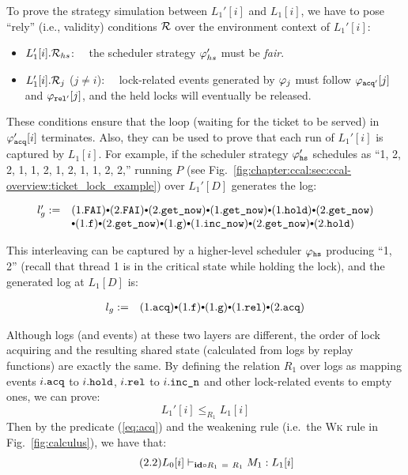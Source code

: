 To prove the strategy simulation between $L_1'[i]$ and $L_1[i]$, we have to  pose ``rely'' (i.e.,
validity) conditions $\mathcal{R}$ over the environment context of $L_1'[i]$:

\begin{itemize}\itemsep1em
\item $L_1'[i].\mathcal{R}_{hs}$:~~  the scheduler strategy $\varphi_{hs}'$ must be \emph{fair}.
\item $L_1'[i].\mathcal{R}_{j}$ ($j\neq i$):~~ lock-related events 
 generated by $\varphi_{j}$ must follow $\varphi_{{\mathrm{\texttt{acq}}}'}[j]$ and $\varphi_{{\mathrm{\texttt{rel}}}'}[j]$, and the held locks will eventually be released.
\end{itemize}

\noindent These conditions ensure that the loop (waiting for the ticket 
to be served) in $\varphi_{{\mathrm{\texttt{acq}}}}'[i]$  terminates. Also, they can be used to prove that each run of $L_1'[i]$ is captured by $L_1[i]$. For example, if the scheduler strategy  $\varphi_{{\mathrm{\texttt{hs}}}}'$ schedules as  ``1, 2, 2, 1, 1, 2, 1, 2, 1, 1, 2, 2,'' running $P$ (see Fig.~\ref{fig:chapter:ccal:sec:ccal-overview:ticket_lock_example}) over $L_1'[D]$ generates the log:%

\begin{small}
\[
\begin{array}{rl}
l'_{g} := &
 (1.\incticket) \cons
(2.\incticket) \cons
(2.\getnow) \cons
(1.\getnow)  \cons 
 (1.\holdlock) \cons 
(2.\getnow) \\
&
\cons (1.\codeinmath{f})
\cons (2.\getnow)
\cons (1.\codeinmath{g})
\cons (1.\incnow) 
\cons (2.\getnow)
\cons (2.\holdlock) 
\end{array}
\]
\end{small}

\noindent This interleaving can be captured by a higher-level scheduler $\varphi_{{\mathrm{\texttt{hs}}}}$ producing ``1, 2'' (recall that thread 1 is in the critical state while holding the lock),
and the generated log at $L_1[D]$ is:%
\begin{small}
\[
\begin{array}{rl}
l_{g} := &
 (1.\codeinmath{acq})
\cons (1.\codeinmath{f})
\cons (1.\codeinmath{g})
\cons (1.\codeinmath{rel})
\cons 
 (2.\codeinmath{acq}) 
\end{array}
\]
\end{small}%
Although logs (and events) at these two layers are different, the order of lock acquiring and 
the resulting shared state (calculated from logs by replay functions) are exactly the same. By defining the relation $R_1$ over logs as mapping events $i.{\mathrm{\texttt{acq}}}$ to $i.{\mathrm{\texttt{hold}}}$, $i.{\mathrm{\texttt{rel}}}$  to $i.{\mathrm{\texttt{inc\_n}}}$ and other lock-related events to empty ones, we can prove:%
$$L_1'[i] \le_{R_1} L_1[i]$$
Then by the predicate (\ref{eq:acq}) and the weakening rule (i.e.\, the \textsc{Wk} rule in Fig.~\ref{fig:calculus}), we have that:%
\begin{equation}\label{eq:acq:h} \tag{2.2}
L_0[i] \vdash_{\textbf{id} \circ R_1\ =\ R_1} M_1 : L_1[i]
\end{equation}


